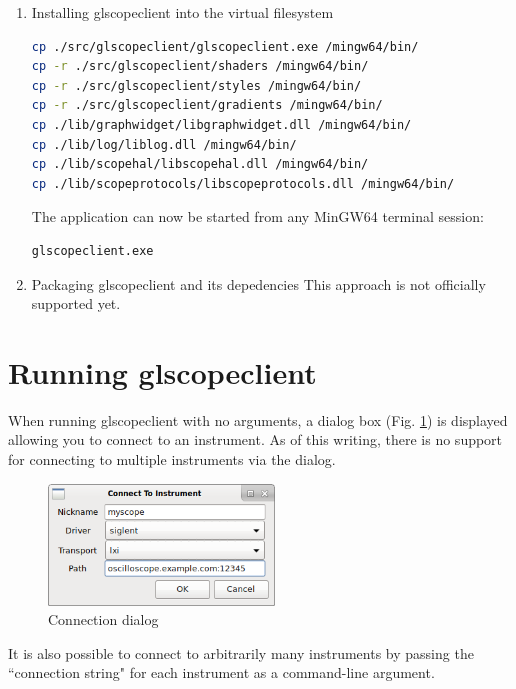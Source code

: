 \begin{enumerate}
\begin{enumerate}
\item Installing glscopeclient into the virtual filesystem
\begin{lstlisting}[language=sh]
cp ./src/glscopeclient/glscopeclient.exe /mingw64/bin/
cp -r ./src/glscopeclient/shaders /mingw64/bin/
cp -r ./src/glscopeclient/styles /mingw64/bin/
cp -r ./src/glscopeclient/gradients /mingw64/bin/
cp ./lib/graphwidget/libgraphwidget.dll /mingw64/bin/
cp ./lib/log/liblog.dll /mingw64/bin/
cp ./lib/scopehal/libscopehal.dll /mingw64/bin/
cp ./lib/scopeprotocols/libscopeprotocols.dll /mingw64/bin/
\end{lstlisting}
\vspace{0.5cm}
The application can now be started from any MinGW64 terminal session:
\vspace{0.5cm}
\begin{lstlisting}[language=sh]
glscopeclient.exe
\end{lstlisting}
\vspace{0.5cm}

\item Packaging glscopeclient and its depedencies
This approach is not officially supported yet.
\end{enumerate}

\end{enumerate}


\section{Running glscopeclient}

When running glscopeclient with no arguments, a dialog box (Fig. \ref{connection-dialog}) is displayed allowing you to
connect to an instrument. As of this writing, there is no support for connecting to multiple instruments via the
dialog.

\begin{figure}[h]
\centering
\includegraphics[width=6cm]{images/connection-dialog.png}
\caption{Connection dialog}
\label{connection-dialog}
\end{figure}

It is also possible to connect to arbitrarily many instruments by passing the ``connection string" for each instrument
as a command-line argument.

